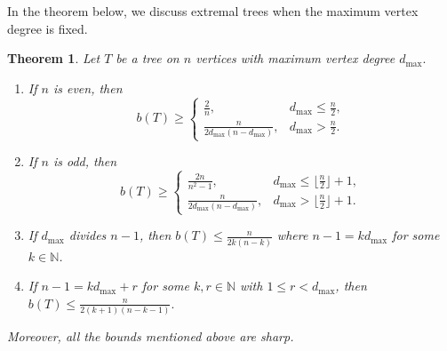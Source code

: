 \documentclass[12pt]{article}
\newtheorem{theorem}{Theorem}[section]
\begin{document}
In the theorem below, we discuss extremal trees when the maximum vertex degree is fixed.
\begin{theorem}\label{extremal-graph-max-vertex-degree}
    Let $T$ be a tree on $n$ vertices with maximum vertex degree $d_{\max}.$       
\begin{enumerate}
    \item If $n$ is even, then
    \[
        b(T) \geq 
        \begin{cases} 
            \frac{2}{n}, & d_{\max} \leq \frac{n}{2}, \\
            \frac{n}{2d_{\max}(n-d_{\max})}, & d_{\max} > \frac{n}{2}.
        \end{cases}
    \]
    \item If $n$ is odd, then
    \[
        b(T) \geq 
        \begin{cases} 
            \frac{2n}{n^2 - 1}, & d_{\max} \leq \lfloor \frac{n}{2} \rfloor + 1, \\
            \frac{n}{2d_{\max}(n-d_{\max})}, & d_{\max} > \lfloor \frac{n}{2} \rfloor + 1.
        \end{cases}
     \]
     \item If $d_{\max}$ divides $n-1$, then $b(T) \leq \frac{n}{2k(n-k)}$ where $n-1=kd_{\max}$ for some $k \in \mathbb{N}$.
     \item If $n-1=k d_{\max}+r$ for some $k,r \in \mathbb{N}$ with $1 \leq r <d_{\max}$, then $b(T) \leq \frac{n}{2(k+1)(n-k-1)}.$
\end{enumerate}
Moreover, all the bounds mentioned above are sharp.
 \end{theorem}
\end{document}

